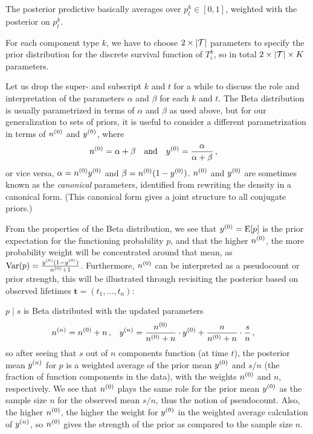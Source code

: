 \documentclass[authoryear, 12pt, a4paper]{elsarticle}
\renewcommand{\vec}[1]{{\bm#1}}
\newcommand{\E}{\operatorname{E}}
\newcommand{\V}{\operatorname{Var}}
\begin{document}
The posterior predictive basically averages over $p^k_t \in [0,1]$,
weighted with the posterior on $p^k_t$.

For each component type $k$, we have to choose $2 \times |{\cal T}|$
parameters to specify the prior distribution for the discrete survival function of $T^k_i$,
so in total $2 \times |{\cal T}| \times K$ parameters.


Let us drop the super- and subscript $k$ and $t$ for a while
to discuss the role and interpretation of the parameters $\alpha$ and $\beta$
for each $k$ and $t$.
The Beta distribution is usually parametrized in terms of $\alpha$ and $\beta$ as used above, 
but for our generalization to sets of priors,
it is useful to consider a different parametrization in terms of $n^{(0)}$ and $y^{(0)}$, where
\begin{align*}
n^{(0)} &= \alpha + \beta &
&\text{and} &
y^{(0)} &= \frac{\alpha}{\alpha + \beta} \,,
\end{align*}
or vice versa, $\alpha = n^{(0)}y^{(0)}$ and $\beta = n^{(0)}(1-y^{(0)})$.
$n^{(0)}$ and $y^{(0)}$ are sometimes known as the \emph{canonical} parameters,
identified from rewriting the density in a canonical form.
(This canonical form gives a joint structure to all conjugate priors.)

From the properties of the Beta distribution,
we see that $\yz = \E[p]$ is the prior expectation for the functioning probability $p$,
and that the higher $n^{(0)}$, the more probability weight will be concentrated around that mean,
as $\V(p) = \frac{\yz (1-\yz)}{\nz + 1}$.
Furthermore, $n^{(0)}$ can be interpreted as a pseudocount or prior strength,
this will be illustrated through revisiting the posterior
based on observed lifetimes $\vec{t} = (t_1, \ldots, t_{n})$:

$p \mid s$ is Beta distributed with the updated parameters
\begin{align}
n^{(n)} &= n^{(0)} + n\,, &
y^{(n)} &= \frac{n^{(0)}}{n^{(0)} + n} \cdot y^{(0)} + \frac{n}{n^{(0)} + n} \cdot \frac{s}{n}\,,
\label{eq:nyupdate}
\end{align}
so after seeing that $s$ out of $n$ components function (at time $t$),
the posterior mean $y^{(n)}$ for $p$ is a weighted average of
the prior mean $y^{(0)}$ and $s/n$ (the fraction of function components in the data),
with the weights $n^{(0)}$ and $n$, respectively.
We see that $n^{(0)}$ plays the same role for the prior mean $y^{(0)}$
as the sample size $n$ for the observed mean $s/n$,
thus the notion of pseudocount.
Also, the higher $n^{(0)}$, the higher the weight for $y^{(0)}$
in the weighted average calculation of $y^{(n)}$,
so $n^{(0)}$ gives the strength of the prior as compared to the sample size $n$.
\end{document}

